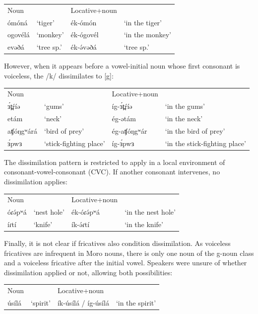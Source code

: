 \ea
\begin{tabular}[t]{llll}
	Noun	&&	Locative+noun\\
	ómóná 	&	‘tiger’		&	ék-ómón		&	‘in the tiger’	\\
	ogovélá	&	‘monkey’		&	ék-ógovél	&	‘in the monkey’\\
	evəðá	&	‘tree sp.’&		ék-ə́vəðá		&	‘tree sp.’\\
\end{tabular}
\z

However, when it appears before a vowel-initial noun whose first consonant is voiceless, the /k/ dissimilates to [g]:

\ea
\begin{tabular}[t]{llll}
	Noun	&&	Locative+noun\\
	ɜ́t̪ŕíə	&	‘gums’	&	íg-ɜ́t̪ŕíə	&	‘in the gums’	\\
 	etám	&	‘neck’	&	ég-ətám		&	‘in the neck’\\
	aʧóŋgʷárá&	‘bird of prey’	&	ég-aʧóŋgʷár	&‘in the bird of prey’\\
	ɜ́pwɜ	&	‘stick-fighting place’	&	íg-ɜ́pwɜ	&	‘in the stick-fighting place’\\
\end{tabular}
\z

The dissimilation pattern is restricted to apply in a local environment of consonant-vowel-consonant (CVC). If another consonant intervenes, no dissimilation applies:

\ea
\begin{tabular}[t]{llll}
	Noun	&&	Locative+noun\\
	óɾə́pʷá	&	‘nest hole’	&	ék-óɾə́pʷá	&‘in the nest hole’\\
	íɾtí	&	‘knife’		&	ík-ə́ɾtí		&‘in the knife’\\
\end{tabular}
\z

Finally, it is not clear if fricatives also condition dissimilation. As voiceless fricatives are infrequent in Moro nouns, there is only one noun of the g-noun class and a voiceless fricative after the initial vowel. Speakers were unsure of whether dissimilation applied or not, allowing both possibilities:

\ea
\begin{tabular}[t]{llll}
	Noun	&&	Locative+noun\\
	úsílá	&	‘spirit’		&	ík-úsílá / íg-úsílá & ‘in the spirit’    \\
\end{tabular}
\z

